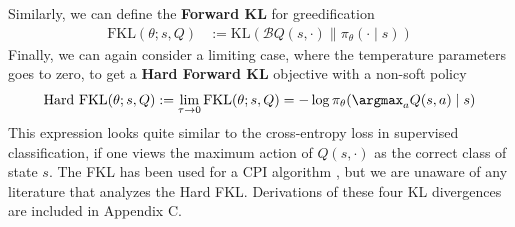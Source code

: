 \documentclass[twoside,11pt]{article}
\newcommand{\R}{\mathbb{R}}
\newcommand{\statespace}{\mathcal{S}}
\newcommand{\actionspace}{\mathcal{A}}
\newcommand{\Qhat}{{Q}}
\newcommand{\KL}{\mathrm{KL}}
\newcommand{\policyparams}{\theta}
\newcommand{\boltzmannQ}{\mathcal{B}Q}
\newcommand{\entropy}{\mathcal{H}}
\newcommand{\defeq}{:=}
\begin{document}
Similarly, we can define the \textbf{Forward KL} for greedification %
%
\begin{align}
\text{FKL}(\policyparams; s, \Qhat) &\defeq  %
    \KL\left(\boltzmannQ(s, \cdot)  \parallel \pi_\policyparams(\cdot \mid s) \right)\nonumber%
\end{align}
%
%
%
Finally, we can again consider a limiting case, where the temperature parameters goes to zero, to get a \textbf{Hard Forward KL} objective with a non-soft policy
%
\begin{align}
  \text{Hard FKL}(\policyparams; s, \Qhat) \defeq  \lim_{\tau \to 0} \text{FKL}(\policyparams; s, \Qhat) = -\log \pi_\policyparams(\argmax_a Q(s, a) \mid s)
\end{align}
%
This expression looks quite similar to the cross-entropy loss in supervised classification, if one views the maximum action of $Q(s, \cdot)$ as the correct class of state $s$. The FKL has been used for a CPI algorithm \citep{vieillard2019deep}, but we are unaware of any literature that analyzes the Hard FKL. Derivations of these four KL divergences are included in Appendix C.
\end{document}
